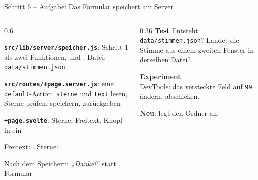 \begin{frame}[fragile]{Schritt 6 -- Aufgabe: Das Formular speichert am Server}
  \footnotesize
  \begin{columns}[onlytextwidth,t]
    \begin{column}{0.6\textwidth}
      \begin{tugenumerate}
        \item \textbf{\texttt{src/lib/server/speicher.js}}: Schritt 1 als zwei
              Funktionen,  und .
              Datei: \texttt{data/stimmen.json}
        \item \textbf{\texttt{src/routes/+page.server.js}}: eine \texttt{default}-Action.
              \texttt{sterne} und \texttt{text} lesen, Sterne prüfen, speichern,
               zurückgeben
        \item \textbf{\texttt{+page.svelte}}: Sterne, Freitext, Knopf
              in ein 
        \item Freitext: . Sterne:
        \item Nach dem Speichern: \emph{„Danke!“} statt Formular
      \end{tugenumerate}
    \end{column}
    \begin{column}{0.36\textwidth}
      \textbf{Test}
      Entsteht \texttt{data/stimmen.json}? Landet die Stimme aus einem
      zweiten Fenster in derselben Datei?

      \vspace{0.4em}
      \textbf{Experiment}\\
      DevTools: das versteckte Feld auf \texttt{99} ändern, abschicken.

      \vspace{0.4em}
      \textbf{Neu}:  legt den Ordner an.
    \end{column}
  \end{columns}
\end{frame}

